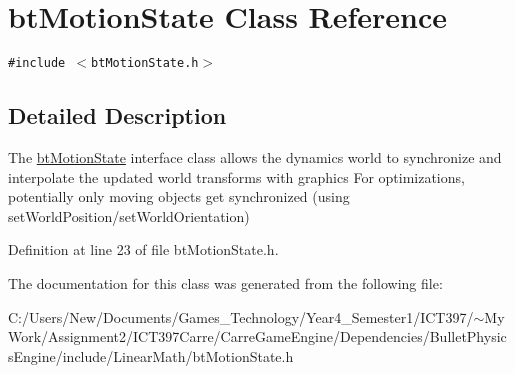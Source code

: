 \hypertarget{classbt_motion_state}{
\section{btMotionState Class Reference}
\label{classbt_motion_state}
}
{\tt \#include $<$btMotionState.h$>$}



\subsection{Detailed Description}
The \hyperlink{classbt_motion_state}{btMotionState} interface class allows the dynamics world to synchronize and interpolate the updated world transforms with graphics For optimizations, potentially only moving objects get synchronized (using setWorldPosition/setWorldOrientation) 

Definition at line 23 of file btMotionState.h.

The documentation for this class was generated from the following file:\begin{CompactItemize}
\item 
C:/Users/New/Documents/Games\_\-Technology/Year4\_\-Semester1/ICT397/$\sim$My Work/Assignment2/ICT397Carre/CarreGameEngine/Dependencies/BulletPhysicsEngine/include/LinearMath/btMotionState.h\end{CompactItemize}

